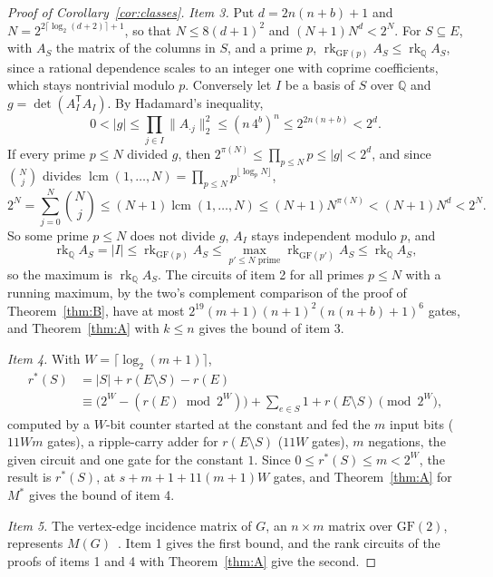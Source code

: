 \begin{proof}[Proof of Corollary~\ref{cor:classes}]
\emph{Item 3.}  Put $d=2n(n+b)+1$ and $N=2^{2\lceil\log_2(d+2)\rceil+1}$, so that
$N\le8(d+1)^{2}$ and $(N+1)N^{d}<2^{N}$.  For $S\subseteq E$, with $A_S$ the
matrix of the columns in $S$, and a prime $p$,
$\operatorname{rk}_{\mathrm{GF}(p)}A_S\le\operatorname{rk}_{\mathbb Q}A_S$, since a
rational dependence scales to an integer one with coprime coefficients, which
stays nontrivial modulo $p$.  Conversely let $I$ be a basis of $S$ over
$\mathbb Q$ and $g=\det(A_I^{\mathsf T}A_I)$.  By Hadamard's inequality,
\[
  0<|g|\le\prod_{j\in I}\|A_{\cdot j}\|_2^{2}\le(n\,4^{b})^{n}\le2^{2n(n+b)}<2^{d}.
\]
If every prime $p\le N$ divided $g$, then $2^{\pi(N)}\le\prod_{p\le N}p\le|g|<2^{d}$,
and since $\binom Nj$ divides
$\operatorname{lcm}(1,\ldots,N)=\prod_{p\le N}p^{\lfloor\log_pN\rfloor}$,
\[
  2^{N}=\sum_{j=0}^{N}\binom Nj\le(N+1)\operatorname{lcm}(1,\ldots,N)
  \le(N+1)N^{\pi(N)}<(N+1)N^{d}<2^{N}.
\]
So some prime $p\le N$ does not divide $g$, $A_I$ stays independent modulo $p$, and
\[
  \operatorname{rk}_{\mathbb Q}A_S=|I|\le\operatorname{rk}_{\mathrm{GF}(p)}A_S
  \le\max_{p'\le N\text{ prime}}\operatorname{rk}_{\mathrm{GF}(p')}A_S\le\operatorname{rk}_{\mathbb Q}A_S,
\]
so the maximum is $\operatorname{rk}_{\mathbb Q}A_S$.
The circuits of item 2 for all primes $p\le N$ with a running maximum, by the
two's complement comparison of the proof of Theorem~\ref{thm:B}, have at most
$2^{19}(m+1)(n+1)^{2}(n(n+b)+1)^{6}$ gates, and Theorem~\ref{thm:A} with $k\le n$ gives the bound of item 3.

\emph{Item 4.}  With $W=\lceil\log_2(m+1)\rceil$,
\[
  \begin{aligned}
  r^{*}(S)&=|S|+r(E\setminus S)-r(E)\\
  &\equiv\bigl(2^{W}-(r(E)\bmod2^{W})\bigr)+\sum_{e\in S}1+r(E\setminus S)\pmod{2^{W}},
  \end{aligned}
\]
computed by a $W$-bit counter started at the constant and fed the $m$ input bits
($11Wm$ gates), a ripple-carry adder for $r(E\setminus S)$ ($11W$ gates), $m$
negations, the given circuit and one gate for the constant $1$.  Since
$0\le r^{*}(S)\le m<2^{W}$, the result is $r^{*}(S)$, at $s+m+1+11(m+1)W$ gates, and Theorem~\ref{thm:A} for $M^{*}$ gives the bound of item 4.

\emph{Item 5.}  The vertex-edge incidence matrix of $G$, an $n\times m$ matrix over
$\mathrm{GF}(2)$, represents $M(G)$~\cite{oxley11}.  Item 1 gives the first bound, and the rank circuits of the proofs of items 1 and 4 with Theorem~\ref{thm:A} give the second.
\end{proof}

